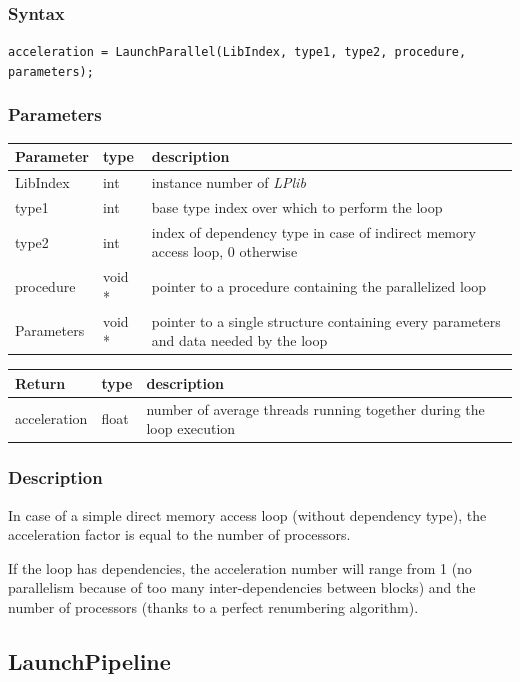 \documentclass[a4paper,12pt]{article}
\begin{document}
\subsubsection*{Syntax}
\tt{acceleration = LaunchParallel(LibIndex, type1, type2, procedure, parameters);}
\normalfont

\subsubsection*{Parameters}
\begin{tabular}{|m{2cm}|m{1.5cm}|m{10.5cm}|}
\hline
Parameter  & type   & description \\
\hline
LibIndex   & int    & instance number of \emph{LPlib} \\
\hline
type1      & int    & base type index over which to perform the loop \\
\hline
type2      & int    & index of dependency type in case of indirect memory access loop, 0 otherwise \\
\hline
procedure  & void * & pointer to a procedure containing the parallelized loop \\
\hline
Parameters & void * & pointer to a single structure containing every parameters and data needed by the loop \\
\hline
\end{tabular}

\medskip

\noindent
\begin{tabular}{|m{2cm}|m{1.5cm}|m{10.5cm}|}
\hline
Return     & type   & description \\
\hline
acceleration & float & number of average threads running together during the loop execution \\
\hline
\end{tabular}

\subsubsection*{Description}
In case of a simple direct memory access loop (without dependency type), the acceleration factor is equal to the number of processors.

If the loop has dependencies, the acceleration number will range from 1 (no parallelism because of too many inter-dependencies between blocks) and the number of processors (thanks to a perfect renumbering algorithm).


\subsection{LaunchPipeline}
\end{document}

